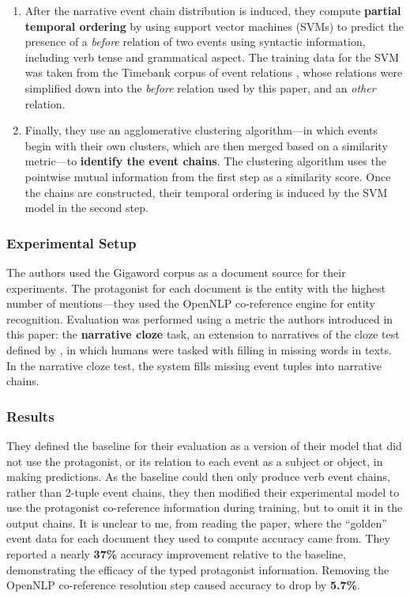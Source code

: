 \begin{enumerate}
\item After the narrative event chain distribution is induced, they compute \textbf{partial temporal ordering} by using support vector machines (SVMs) to predict the presence of a \textit{before} relation of two events using syntactic information, including verb tense and grammatical aspect. The training data for the SVM was taken from the Timebank corpus of event relations \citep{pustejovsky2003timebank}, whose relations were simplified down into the \textit{before} relation used by this paper, and an \textit{other} relation.

\item Finally, they use an agglomerative clustering algorithm---in which events begin with their own clusters, which are then merged based on a similarity metric---to \textbf{identify the event chains}. The clustering algorithm uses the pointwise mutual information from the first step as a similarity score. Once the chains are constructed, their temporal ordering is induced by the SVM model in the second step.
\end{enumerate}

\subsubsection{Experimental Setup}
\label{sec:narrativecloze}
The authors used the Gigaword corpus \citep{parker2011english} as a document source for their experiments. The protagonist for each document is the entity with the highest number of mentions---they used the OpenNLP co-reference engine \citep{baldridge2005opennlp} for entity recognition.  Evaluation was performed using a metric the authors introduced in this paper: the \textbf{narrative cloze} task, an extension to narratives of the cloze test defined by \citep{taylor1953cloze}, in which humans were tasked with filling in missing words in texts. In the narrative cloze test, the system fills missing event tuples into narrative chains.

\subsubsection{Results}
They defined the baseline for their evaluation as a version of their model that did not use the protagonist, or its relation to each event as a subject or object, in making predictions. As the baseline could then only produce verb event chains, rather than 2-tuple event chains, they then modified their experimental model to use the protagonist co-reference information during training, but to omit it in the output chains. It is unclear to me, from reading the paper,  where the ``golden'' event data for each document they used to compute accuracy came from. They reported a nearly \textbf{37\%} accuracy improvement relative to the baseline, demonstrating the efficacy of the typed protagonist information. Removing the OpenNLP co-reference resolution step caused accuracy to drop by \textbf{5.7\%}.

